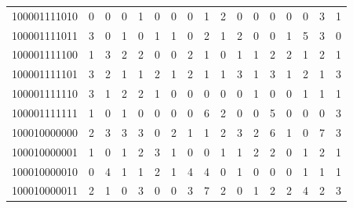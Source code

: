 \documentclass[10pt,a4paper]{article}
\begin{document}
\begin{longtable}{ |c|c|c|c|c|c|c|c|c|c|c|c|c|c|c|c|c| }
    100001111010              & 0                            & 0                                & 0                            & 1                              & 0   & 0   & 0   & 1   & 2   & 0   & 0   & 0   & 0   & 0   & 3   & 1   \\
    100001111011              & 3                            & 0                                & 1                            & 0                              & 1   & 1   & 0   & 2   & 1   & 2   & 0   & 0   & 1   & 5   & 3   & 0   \\
    100001111100              & 1                            & 3                                & 2                            & 2                              & 0   & 0   & 2   & 1   & 0   & 1   & 1   & 2   & 2   & 1   & 2   & 1   \\
    100001111101              & 3                            & 2                                & 1                            & 1                              & 2   & 1   & 2   & 1   & 1   & 3   & 1   & 3   & 1   & 2   & 1   & 3   \\
    100001111110              & 3                            & 1                                & 2                            & 2                              & 1   & 0   & 0   & 0   & 0   & 0   & 1   & 0   & 0   & 1   & 1   & 1   \\
    100001111111              & 1                            & 0                                & 1                            & 0                              & 0   & 0   & 0   & 6   & 2   & 0   & 0   & 5   & 0   & 0   & 0   & 3   \\
    100010000000              & 2                            & 3                                & 3                            & 3                              & 0   & 2   & 1   & 1   & 2   & 3   & 2   & 6   & 1   & 0   & 7   & 3   \\
    100010000001              & 1                            & 0                                & 1                            & 2                              & 3   & 1   & 0   & 0   & 1   & 1   & 2   & 2   & 0   & 1   & 2   & 1   \\
    100010000010              & 0                            & 4                                & 1                            & 1                              & 2   & 1   & 4   & 4   & 0   & 1   & 0   & 0   & 0   & 1   & 1   & 1   \\
    100010000011              & 2                            & 1                                & 0                            & 3                              & 0   & 0   & 3   & 7   & 2   & 0   & 1   & 2   & 2   & 4   & 2   & 3   \\

\end{longtable}
\end{document}
